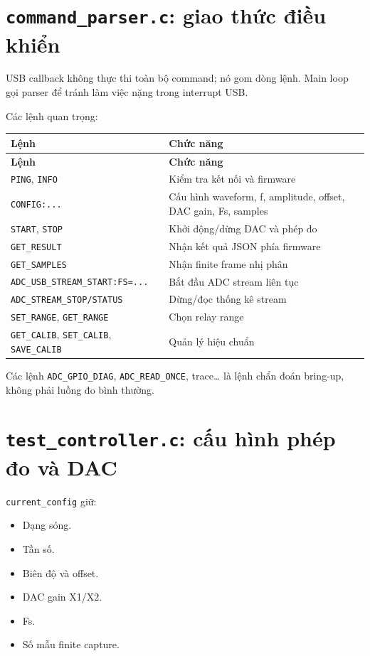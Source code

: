 \documentclass[12pt,a4paper,oneside]{article}
\newcommand{\inlinecode}[1]{\texttt{#1}}
\begin{document}
\section{\inlinecode{command\_parser.c}: giao thức điều khiển}

USB callback không thực thi toàn bộ command; nó gom dòng lệnh. Main loop gọi parser để tránh làm việc nặng trong interrupt USB.

Các lệnh quan trọng:

\begin{longtable}{|>{\raggedright\arraybackslash}p{}|>{\raggedright\arraybackslash}p{}|}
\hline
\textbf{Lệnh} & \textbf{Chức năng} \\ \hline
\endfirsthead
\hline
\textbf{Lệnh} & \textbf{Chức năng} \\ \hline
\endhead
\inlinecode{PING}, \inlinecode{INFO} & Kiểm tra kết nối và firmware \\ \hline
\inlinecode{CONFIG:...} & Cấu hình waveform, f, amplitude, offset, DAC gain, Fs, samples \\ \hline
\inlinecode{START}, \inlinecode{STOP} & Khởi động/dừng DAC và phép đo \\ \hline
\inlinecode{GET\_RESULT} & Nhận kết quả JSON phía firmware \\ \hline
\inlinecode{GET\_SAMPLES} & Nhận finite frame nhị phân \\ \hline
\inlinecode{ADC\_USB\_STREAM\_START:FS=...} & Bắt đầu ADC stream liên tục \\ \hline
\inlinecode{ADC\_STREAM\_STOP/STATUS} & Dừng/đọc thống kê stream \\ \hline
\inlinecode{SET\_RANGE}, \inlinecode{GET\_RANGE} & Chọn relay range \\ \hline
\inlinecode{GET\_CALIB}, \inlinecode{SET\_CALIB}, \inlinecode{SAVE\_CALIB} & Quản lý hiệu chuẩn \\ \hline
\end{longtable}

Các lệnh \inlinecode{ADC\_GPIO\_DIAG}, \inlinecode{ADC\_READ\_ONCE}, trace… là lệnh chẩn đoán bring-up, không phải luồng đo bình thường.

\section{\inlinecode{test\_controller.c}: cấu hình phép đo và DAC}

\inlinecode{current\_config} giữ:

\begin{itemize}
\item Dạng sóng.
\item Tần số.
\item Biên độ và offset.
\item DAC gain X1/X2.
\item Fs.
\item Số mẫu finite capture.
\end{itemize}
\end{document}
